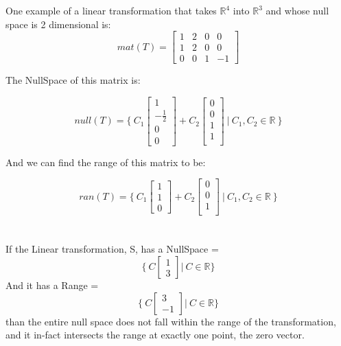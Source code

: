\documentclass[12pt]{article}
\begin{document}
\section{}

One example of a linear transformation that takes $\mathbb{R}^{4}$ into $\mathbb{R}^{3}$ and whose null space is 2 dimensional is:
\[
mat(T) = 
\begin{bmatrix}
1 & 2 & 0 & 0\\
1 & 2 & 0 & 0\\
0 & 0 & 1 & -1
\end{bmatrix}
\]

The NullSpace of this matrix is:

\[
null(T) = 
\{ \ 
C_{1}
\begin{bmatrix}
1\\
-\frac{1}{2}\\
0\\
0
\end{bmatrix}
+
C_{2}
\begin{bmatrix}
0\\
0\\
1\\
1\\
\end{bmatrix}
\ | \ 
C_{1}, C_{2} \in \mathbb{R}
\ \}
\]

And we can find the range of this matrix to be:

\[
ran(T) = 
\{ \ 
C_{1}
\begin{bmatrix}
1\\
1\\
0
\end{bmatrix}
+
C_{2}
\begin{bmatrix}
0\\
0\\
1\\
\end{bmatrix}
\ | \ 
C_{1}, C_{2} \in \mathbb{R}
\ \}
\]

\section{}

If the Linear transformation, S, has a NullSpace = 
\[
\{ \ C
\begin{bmatrix}
1\\
3
\end{bmatrix}
| \ C \in \mathbb{R} \}
\]
And it has a Range = 
\[
\{ \ C
\begin{bmatrix}
3\\
-1
\end{bmatrix}
| \ C \in \mathbb{R} \}
\]
than the entire null space does not fall within the range of the transformation, and it in-fact intersects the range at exactly one point, the zero vector.\\
\end{document}
